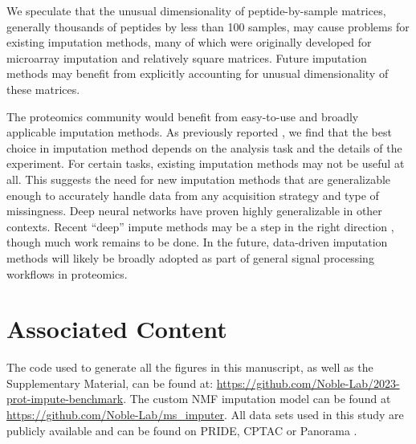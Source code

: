 \documentclass{article}
\begin{document}
We speculate that the unusual dimensionality of peptide-by-sample matrices, generally thousands of peptides by less than 100 samples, may cause problems for existing imputation methods, many of which were originally developed for microarray imputation and relatively square matrices. Future imputation methods may benefit from explicitly accounting for unusual dimensionality of these matrices. 

The proteomics community would benefit from easy-to-use and broadly applicable imputation methods. As previously reported \cite{Bramer:review, Webb-Robertson:review, DIMA, lazar}, we find that the best choice in imputation method depends on the analysis task and the details of the experiment. For certain tasks, existing imputation methods may not be useful at all. This suggests the need for new imputation methods that are generalizable enough to accurately handle data from any acquisition strategy and type of missingness. Deep neural networks have proven highly generalizable in other contexts. Recent ``deep'' impute methods may be a step in the right direction \cite{deep-impute}, though much work remains to be done. In the future, data-driven imputation methods will likely be broadly adopted as part of general signal processing workflows in proteomics.

\section*{Associated Content}

The code used to generate all the figures in this manuscript, as well as the Supplementary Material, can be found at: \url{https://github.com/Noble-Lab/2023-prot-impute-benchmark}. The custom NMF imputation model can be found at \url{https://github.com/Noble-Lab/ms_imputer}. All data sets used in this study are publicly available and can be found on PRIDE, CPTAC or Panorama \cite{PRIDE, CPTAC, panorama-public}. 


 

\clearpage
\appendix
\renewcommand{\figurename}{Supplementary Figure}
\renewcommand{\theequation}{S\arabic{equation}}
\renewcommand{\thefigure}{S\arabic{figure}}
\renewcommand{\thesection}{S\arabic{section}}
\renewcommand{\thetable}{S\arabic{table}}
\setcounter{table}{0}
\setcounter{figure}{0}
\end{document}
